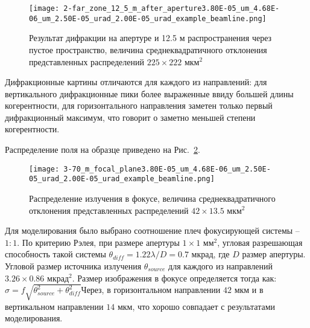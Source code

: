 \begin{figure}[H] 
	\centering 	\texttt{[image: 2-far\_zone\_12\_5\_m\_after\_aperture3.80E-05\_um\_4.68E-06\_um\_2.50E-05\_urad\_2.00E-05\_urad\_example\_beamline.png]}
	\caption{Результат дифракции на апертуре и 12.5 м распространения через пустое пространство, величина среднеквадратичного отклонения представленных распределений $225 \times 222$ мкм$^2$}
	\label{fig:focusing_system_after_aperture}
\end{figure}
\noindent Дифракционные картины отличаются для каждого из направлений: для вертикального дифракционные пики более выраженные ввиду большей длины когерентности, для горизонтального направления заметен только первый дифракционный максимум, что говорит о заметно меньшей степени когерентности.

Распределение поля на образце приведено на Рис.~\ref{fig:focusing_system_in_focus}.
\begin{figure}[H] 
	\centering 	\texttt{[image: 3-70\_m\_focal\_plane3.80E-05\_um\_4.68E-06\_um\_2.50E-05\_urad\_2.00E-05\_urad\_example\_beamline.png]}
	\caption{Распределение излучения в фокусе, величина среднеквадратичного отклонения представленных распределений $42 \times 13.5$ мкм$^2$}
	\label{fig:focusing_system_in_focus}
\end{figure}
\noindent Для моделирования было выбрано соотношение плеч фокусирующей системы -- $1:1$. По критерию Рэлея, при размере апертуры $1 \times 1$ мм$^2$, угловая разрешающая способность такой системы $\theta_{diff} = 1.22 \lambda / D  = 0.7$ мкрад, где $D$ размер апертуры. Угловой размер источника излучения $\theta_{source}$ для каждого из направлений $3.26 \times 0.86$ мкрад$^2$. Размер изображения в фокусе определяется тогда как: $\sigma = f\sqrt{\theta^2_{source} +  \theta^2_{diff}}Через$, в горизонтальном направлении $42$ мкм и в вертикальном направлении $14$ мкм, что хорошо совпадает с результатами моделирования.  

